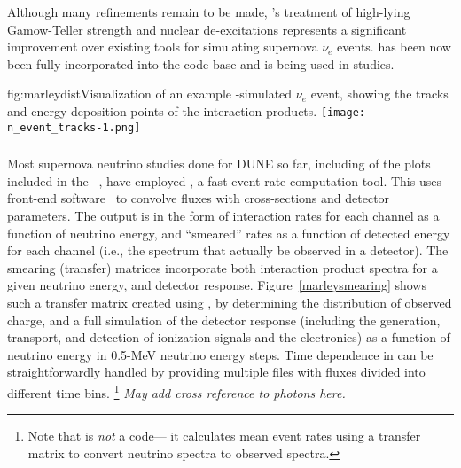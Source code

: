 Although many refinements remain to be made, 's treatment of high-lying
Gamow-Teller strength and nuclear de-excitations represents a significant
improvement over existing tools for simulating supernova $\nu_e$  events.   has been now been fully incorporated into the  code base 
and is being used in studies.



\begin{dunefigure}{fig:marleydist}{Visualization of an
    example -simulated $\nu_e$ event, showing the tracks and energy
    deposition points of the interaction products. }
\texttt{[image: n\_event\_tracks-1.png]}
\end{dunefigure}


\subsubsection{ }\label{snowglobes}

Most supernova neutrino studies done for DUNE so far, including of the
plots included in the ~\cite{Acciarri:2015uup}, have employed
 \cite{snowglobes}, a fast event-rate computation tool.  This
uses %
 front-end software~\cite{Huber:2004ka,globes} to
convolve fluxes with cross-sections and detector parameters.  The
output is in the form of interaction rates for each channel as a
function of neutrino energy, and ``smeared'' rates as a function of
detected energy for each channel (i.e., the spectrum that
actually be observed in a detector).  
The smearing (transfer) matrices incorporate both
interaction product spectra for a given neutrino energy, and detector
response.   Figure~\ref{marleysmearing} shows such a transfer matrix
created
using , by determining the distribution of observed charge, and
 a full simulation of the detector response (including the generation,
 transport, and detection of ionization signals and the electronics)
 as a function of neutrino energy in 0.5-MeV neutrino energy steps.
Time dependence in   can be straightforwardly
handled by providing multiple files with fluxes divided into different
time bins. \footnote{Note that   is \textit{not} a 
code--- it calculates mean event rates using a transfer matrix to
convert neutrino spectra to observed spectra.}
\textit{May add cross reference to photons here.}

